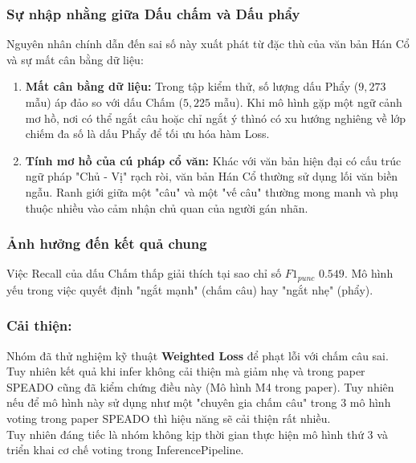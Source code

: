 \subsubsection{Sự nhập nhằng giữa Dấu chấm và Dấu phẩy}
Nguyên nhân chính dẫn đến sai số này xuất phát từ đặc thù của văn bản Hán Cổ và sự mất cân bằng dữ liệu:

\begin{enumerate}
    \item \textbf{Mất cân bằng dữ liệu:} Trong tập kiểm thử, số lượng dấu Phẩy ($9,273$ mẫu) áp đảo so với dấu Chấm ($5,225$ mẫu). Khi mô hình gặp một ngữ cảnh mơ hồ, nơi có thể ngắt câu hoặc chỉ ngắt ý thìnó có xu hướng nghiêng về lớp chiếm đa số là dấu Phẩy để tối ưu hóa hàm Loss.
    
    \item \textbf{Tính mơ hồ của cú pháp cổ văn:} Khác với văn bản hiện đại có cấu trúc ngữ pháp "Chủ - Vị" rạch ròi, văn bản Hán Cổ thường sử dụng lối văn biền ngẫu. Ranh giới giữa một "câu" và một "vế câu" thường mong manh và phụ thuộc nhiều vào cảm nhận chủ quan của người gán nhãn.
\end{enumerate}

\subsubsection{Ảnh hưởng đến kết quả chung}
Việc Recall của dấu Chấm thấp giải thích tại sao chỉ số $F1_{punc}$ $0.549$. Mô hình yếu trong việc quyết định "ngắt mạnh" (chấm câu) hay "ngắt nhẹ" (phẩy).

\subsubsection{Cải thiện:} 
Nhóm đã thử nghiệm kỹ thuật \textbf{Weighted Loss} để phạt lỗi với chấm câu sai. Tuy nhiên kết quả khi infer không cải thiện mà giảm nhẹ và trong paper SPEADO cũng đã kiểm chứng điều này (Mô hình M4 trong paper). Tuy nhiên nếu để mô hình này sử dụng như một "chuyên gia chấm câu" trong 3 mô hình voting trong paper SPEADO thì hiệu năng sẽ cải thiện rất nhiều.
\\
Tuy nhiên đáng tiếc là nhóm không kịp thời gian thực hiện mô hình thứ 3 và triển khai cơ chế voting trong InferencePipeline. 